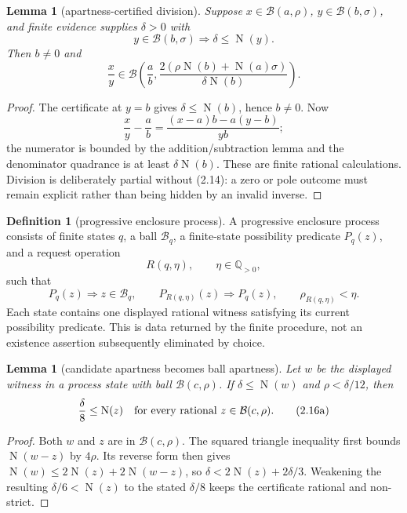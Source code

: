 \documentclass[10pt]{article}
\newtheorem{lemma}[theorem]{Lemma}
\theoremstyle{definition}
\newtheorem{definition}[theorem]{Definition}
\theoremstyle{remark}
\newcommand{\Q}{\mathbb{Q}}
\newcommand{\Norm}{\operatorname{N}}
\begin{document}
\begin{lemma}[apartness-certified division]
Suppose $x\in\mathcal B(a,\rho)$, $y\in\mathcal B(b,\sigma)$, and finite
evidence supplies $\delta>0$ with
\[
 y\in\mathcal B(b,\sigma)\Longrightarrow
 \delta\le\Norm(y).
\tag{2.14}
\]
Then $b\ne0$ and
\[
 \frac{x}{y}\in
 \mathcal B\!\left(\frac ab,
 \frac{2(\rho\Norm(b)+\Norm(a)\sigma)}
      {\delta\Norm(b)}\right).
\tag{2.15}
\]
\end{lemma}

\begin{proof}
The certificate at $y=b$ gives $\delta\le\Norm(b)$, hence $b\ne0$.  Now
\[
 \frac{x}{y}-\frac ab
 =\frac{(x-a)b-a(y-b)}{yb};
\]
the numerator is bounded by the addition/subtraction lemma and the
denominator quadrance is at least $\delta\Norm(b)$.  These are finite
rational calculations.  Division is deliberately partial without (2.14):
a zero or pole outcome must remain explicit rather than being hidden by an
invalid inverse.
\end{proof}

\begin{definition}[progressive enclosure process]
A progressive enclosure process consists of finite states $q$, a ball
$\mathcal B_q$, a finite-state possibility predicate $P_q(z)$, and a request
operation
\[
 R(q,\eta),\qquad \eta\in\Q_{>0},
\]
such that
\[
 P_q(z)\Longrightarrow z\in\mathcal B_q,
 \qquad
 P_{R(q,\eta)}(z)\Longrightarrow P_q(z),
 \qquad
 \rho_{R(q,\eta)}<\eta.
\tag{2.16}
\]
Each state contains one displayed rational witness satisfying its current
possibility predicate.  This is data returned by the finite procedure, not an
existence assertion subsequently eliminated by choice.
\end{definition}

\begin{lemma}[candidate apartness becomes ball apartness]
Let $w$ be the displayed witness in a process state with ball
$\mathcal B(c,\rho)$.  If $\delta\le\Norm(w)$ and
$\rho<\delta/12$, then
\[
 \frac{\delta}{8}\le\Norm(z)
 \quad\hbox{for every rational }z\in\mathcal B(c,\rho).
\tag{2.16a}
\]
\end{lemma}

\begin{proof}
Both $w$ and $z$ are in $\mathcal B(c,\rho)$.  The squared triangle
inequality first bounds $\Norm(w-z)$ by $4\rho$.  Its reverse form then gives
$\Norm(w)\le2\Norm(z)+2\Norm(w-z)$, so
$\delta<2\Norm(z)+2\delta/3$.  Weakening the resulting
$\delta/6<\Norm(z)$ to the stated $\delta/8$ keeps the certificate rational
and non-strict.
\end{proof}
\end{document}
